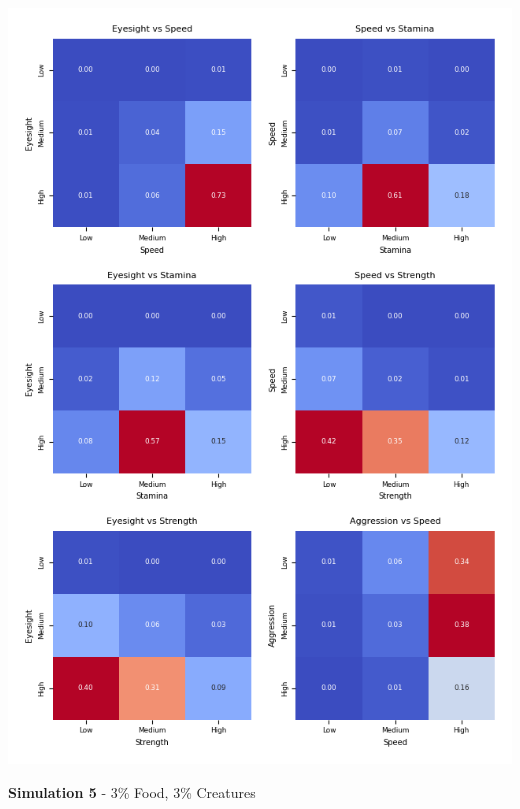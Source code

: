 \documentclass{article}
\begin{document}
\begin{center}
    \includegraphics[scale=0.9]{tests/2.4_confusion_matrices.png}
\end{center}
\textbf{Simulation 5} - 3\% Food, 3\% Creatures
\end{document}
